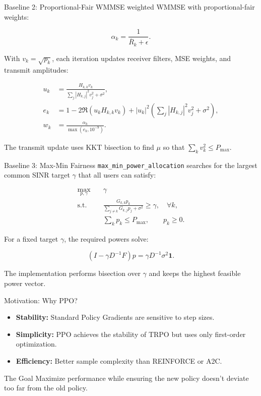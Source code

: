 \documentclass[aspectratio=169]{beamer}
\newcommand{\Rbar}{\overline{R}}
\begin{document}
\begin{frame}{Baseline 2: Proportional-Fair WMMSE}
  weighted WMMSE with proportional-fair weights:

  \[
    \alpha_k = \frac{1}{\Rbar_k + \epsilon}.
  \]

  With $v_k=\sqrt{p_k}$, each iteration updates receiver filters, MSE weights, and transmit amplitudes:

  \begin{align*}
    u_k &=
    \frac{H_{k,k}v_k}
         {\sum_j |H_{k,j}|^2 v_j^2 + \sigma^2}, \\
    e_k &=
    1 - 2\Re(u_k H_{k,k}v_k)
      + |u_k|^2\left(\sum_j |H_{k,j}|^2 v_j^2 + \sigma^2\right), \\
    w_k &= \frac{\alpha_k}{\max(e_k, 10^{-9})}.
  \end{align*}

  The transmit update uses KKT bisection to find $\mu$ so that $\sum_k v_k^2 \le P_{\max}$.
\end{frame}

\begin{frame}{Baseline 3: Max-Min Fairness}
  \texttt{max\_min\_power\_allocation} searches for the largest common SINR target $\gamma$ that all users can satisfy:

  \begin{align*}
    \max_{p,\gamma}\quad &\gamma \\
    \text{s.t.}\quad
      &\frac{G_{k,k}p_k}{\sum_{j \ne k}G_{k,j}p_j + \sigma^2} \ge \gamma,
      \quad \forall k, \\
      &\sum_k p_k \le P_{\max}, \qquad p_k \ge 0.
  \end{align*}

  For a fixed target $\gamma$, the required powers solve:

  \[
    \left(I - \gamma D^{-1}F\right)p
      = \gamma D^{-1}\sigma^2\mathbf{1}.
  \]

  The implementation performs bisection over $\gamma$ and keeps the highest feasible power vector.
\end{frame}

\begin{frame}{Motivation: Why PPO?}
    \begin{itemize}
        \item \textbf{Stability:} Standard Policy Gradients are sensitive to step sizes.
        \item \textbf{Simplicity:} PPO achieves the stability of TRPO but uses only first-order optimization.
        \item \textbf{Efficiency:} Better sample complexity than REINFORCE or A2C.
    \end{itemize}
    \begin{block}{The Goal}
        Maximize performance while ensuring the new policy doesn't deviate too far from the old policy.
    \end{block}
\end{frame}
\end{document}

